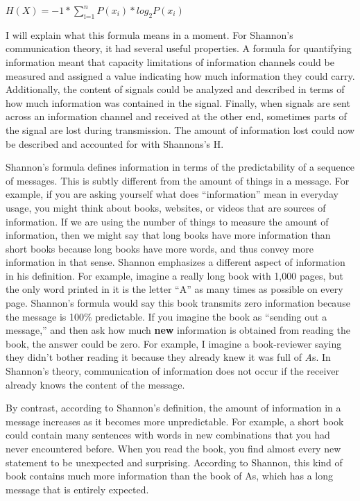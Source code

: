\documentclass[
  oneside,
  12pt]{crumpbook}
\begin{document}
\(H(X) = -1*\sum_\text{i=1}^n P(x_i) * log_2 P(x_i)\)

I will explain what this formula means in a moment. For Shannon's communication theory, it had several useful properties. A formula for quantifying information meant that capacity limitations of information channels could be measured and assigned a value indicating how much information they could carry. Additionally, the content of signals could be analyzed and described in terms of how much information was contained in the signal. Finally, when signals are sent across an information channel and received at the other end, sometimes parts of the signal are lost during transmission. The amount of information lost could now be described and accounted for with Shannons's H.

Shannon's formula defines information in terms of the predictability of a sequence of messages. This is subtly different from the amount of things in a message. For example, if you are asking yourself what does ``information'' mean in everyday usage, you might think about books, websites, or videos that are sources of information. If we are using the number of things to measure the amount of information, then we might say that long books have more information than short books because long books have more words, and thus convey more information in that sense. Shannon emphasizes a different aspect of information in his definition. For example, imagine a really long book with 1,000 pages, but the only word printed in it is the letter ``A'' as many times as possible on every page. Shannon's formula would say this book transmits zero information because the message is 100\% predictable. If you imagine the book as ``sending out a message,'' and then ask how much \textbf{new} information is obtained from reading the book, the answer could be zero. For example, I imagine a book-reviewer saying they didn't bother reading it because they already knew it was full of \emph{A}s. In Shannon's theory, communication of information does not occur if the receiver already knows the content of the message.

By contrast, according to Shannon's definition, the amount of information in a message increases as it becomes more unpredictable. For example, a short book could contain many sentences with words in new combinations that you had never encountered before. When you read the book, you find almost every new statement to be unexpected and surprising. According to Shannon, this kind of book contains much more information than the book of As, which has a long message that is entirely expected.
\end{document}
